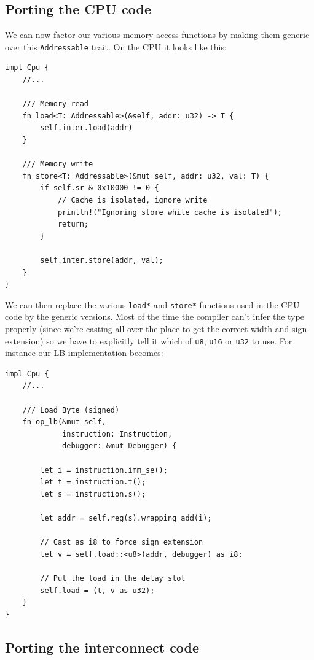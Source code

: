 \documentclass[a4paper]{article}
\newcommand{\code}[1] {\texttt{#1}}
\begin{document}
\subsection{Porting the CPU code}

We can now factor our various memory access functions by making them
generic over this \code{Addressable} trait. On the CPU it looks like
this:

\begin{lstlisting}
impl Cpu {
    //...    

    /// Memory read
    fn load<T: Addressable>(&self, addr: u32) -> T {
        self.inter.load(addr)
    }
    
    /// Memory write
    fn store<T: Addressable>(&mut self, addr: u32, val: T) {
        if self.sr & 0x10000 != 0 {
            // Cache is isolated, ignore write
            println!("Ignoring store while cache is isolated");
            return;
        }

        self.inter.store(addr, val);
    }
}
\end{lstlisting}

We can then replace the various \code{load*} and \code{store*}
functions used in the CPU code by the generic versions. Most of the
time the compiler can't infer the type properly (since we're casting
all over the place to get the correct width and sign extension) so we
have to explicitly tell it which of \code{u8}, \code{u16} or
\code{u32} to use. For instance our LB implementation becomes:

\begin{lstlisting}
impl Cpu {
    //...    

    /// Load Byte (signed)
    fn op_lb(&mut self,
             instruction: Instruction,
             debugger: &mut Debugger) {

        let i = instruction.imm_se();
        let t = instruction.t();
        let s = instruction.s();

        let addr = self.reg(s).wrapping_add(i);

        // Cast as i8 to force sign extension
        let v = self.load::<u8>(addr, debugger) as i8;

        // Put the load in the delay slot
        self.load = (t, v as u32);
    }
}
\end{lstlisting}

\subsection{Porting the interconnect code}
\end{document}
